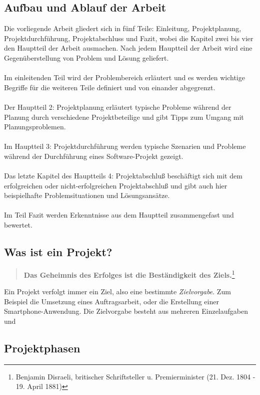 \documentclass[11pt]{scrartcl}
\begin{document}
\cite{studie_verhalten_projektmitarbeiter}

\subsection{Aufbau und Ablauf der Arbeit}
Die vorliegende Arbeit gliedert sich in fünf Teile: Einleitung, Projektplanung, Projektdurchführung, Projektabschluss und Fazit, wobei die Kapitel zwei bis vier den Hauptteil der Arbeit ausmachen. Nach jedem Hauptteil der Arbeit wird eine Gegenüberstellung von Problem und Lösung geliefert. 
\\ \\
Im einleitenden Teil wird der Problembereich erläutert und es werden wichtige Begriffe für die weiteren Teile definiert und von einander abgegrenzt. 
\\ \\
Der Hauptteil 2: Projektplanung erläutert typische Probleme während der Planung durch verschiedene Projektbeteilige und gibt Tipps zum Umgang mit Planungsproblemen. 
\\ \\
Im Hauptteil 3: Projektdurchführung werden typische Szenarien und Probleme während der Durchführung eines Software-Projekt gezeigt. 
\\ \\
Das letzte Kapitel des Hauptteils 4: Projektabschluß beschäftigt sich mit dem erfolgreichen oder nicht-erfolgreichen Projektabschluß und gibt auch hier beispielhafte Problemsituationen und Lösungsansätze. 
\\ \\
Im Teil Fazit werden Erkenntnisse aus dem Hauptteil zusammengefast und bewertet. 
\subsection{Was ist ein Projekt?}


\begin{quote}
\colorbox{blue!5}{\textbf{Das Geheimnis des Erfolges ist die Beständigkeit des Ziels.}}\footnote{Benjamin Disraeli, britischer Schriftsteller u. Premierminister (21. Dez. 1804 - 19. April 1881)}
\end{quote}
Ein Projekt verfolgt immer ein Ziel, also eine bestimmte \textit{Zielvorgabe}. Zum Beispiel die Umsetzung eines Auftragsarbeit, oder die Erstellung einer Smartphone-Anwendung. Die Zielvorgabe besteht aus mehreren Einzelaufgaben und 

\subsection{Projektphasen}
\end{document}

